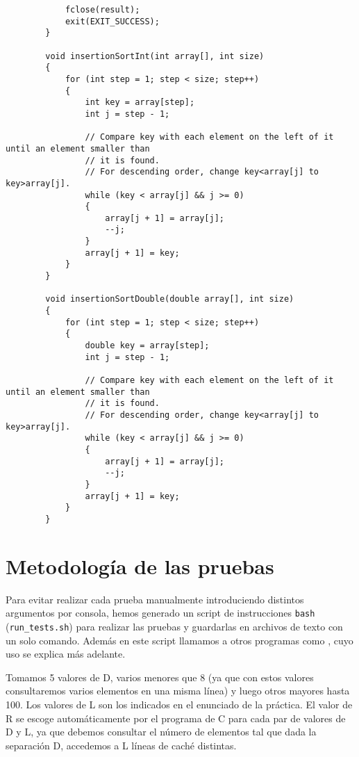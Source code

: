 \documentclass[a4paper,twocolumn]{article}
\begin{document}
\begin{lstlisting}
            fclose(result);
            exit(EXIT_SUCCESS);
        }
        
        void insertionSortInt(int array[], int size)
        {
            for (int step = 1; step < size; step++)
            {
                int key = array[step];
                int j = step - 1;
        
                // Compare key with each element on the left of it until an element smaller than
                // it is found.
                // For descending order, change key<array[j] to key>array[j].
                while (key < array[j] && j >= 0)
                {
                    array[j + 1] = array[j];
                    --j;
                }
                array[j + 1] = key;
            }
        }
        
        void insertionSortDouble(double array[], int size)
        {
            for (int step = 1; step < size; step++)
            {
                double key = array[step];
                int j = step - 1;
        
                // Compare key with each element on the left of it until an element smaller than
                // it is found.
                // For descending order, change key<array[j] to key>array[j].
                while (key < array[j] && j >= 0)
                {
                    array[j + 1] = array[j];
                    --j;
                }
                array[j + 1] = key;
            }
        }
    \end{lstlisting}
    \newpage
    \twocolumn
	\section{Metodología de las pruebas}
	Para evitar realizar cada prueba manualmente introduciendo distintos argumentos por consola, hemos generado un script de instrucciones \texttt{bash} (\texttt{run\_tests.sh}) para realizar las pruebas y guardarlas en archivos de texto con un solo comando. Además en este script llamamos a otros programas como , cuyo uso se explica más adelante.\par
	
	Tomamos 5 valores de D, varios menores que 8 (ya que con estos valores consultaremos varios elementos en una misma línea) y luego otros mayores hasta 100. Los valores de L son los indicados en el enunciado de la práctica. El valor de R se escoge automáticamente por el programa de C para cada par de valores de D y L, ya que debemos consultar el número de elementos tal que dada la separación D, accedemos a L líneas de caché distintas.\par
	
\end{document}
